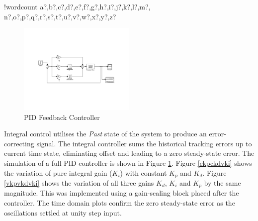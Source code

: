 \documentclass[11pt]{article}
\newcounter{words}
\newenvironment{counted}{%
  \setcounter{words}{0}
  \SearchList!{wordcount}{\stepcounter{words}}
    {a?,b?,c?,d?,e?,f?,g?,h?,i?,j?,k?,l?,m?,
    n?,o?,p?,q?,r?,s?,t?,u?,v?,w?,x?,y?,z?}
  \UndoBoundary{'}
  \SearchOrder{p;}}{%
  \StopSearching}
\begin{document}
\begin{counted}
\begin{figure}
\centering
\vspace{-35pt} %
\includegraphics[trim = 0 0 0 0, clip, width=0.5\textwidth]{PIDp2.pdf}
\vspace{-15pt}
\caption{PID Feedback Controller}
\label{PIDp2}
\vspace{-15pt}
\end{figure}

Integral control utilises the \emph{Past} state of the system to produce
an error-correcting signal. The integral controller sums the historical
tracking errors up to current time state, eliminating offset and leading
to a zero steady-state error. The simulation of a full PID controller is
shown in Figure \ref{PIDp2}. Figure \ref{ckpckdvki} shows the variation
of pure integral gain (\(K_i\)) with constant \(K_p\) and \(K_d\).
Figure \ref{vkpvkdvki} shows the variation of all three gains \(K_d\),
\(K_i\) and \(K_p\) by the same magnitude. This was implemented using a
gain-scaling block placed after the controller. The time domain plots
confirm the zero steady-state error as the oscillations settled at unity
step input.


\end{counted}
\end{document}
